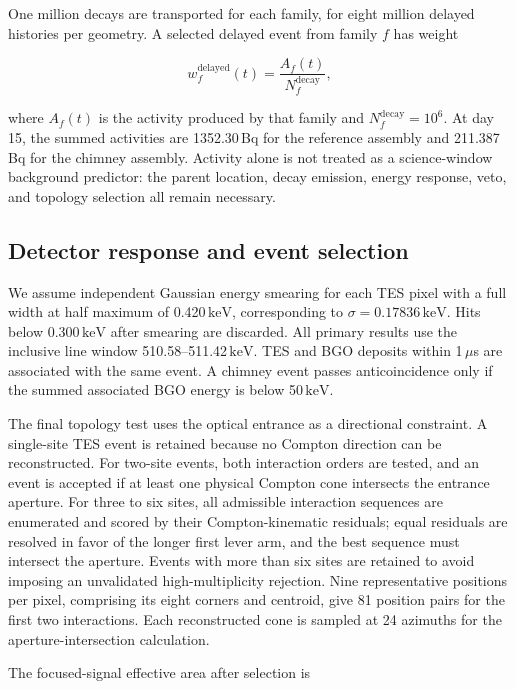 \documentclass[11pt]{article}
\newcommand{\keV}{\ensuremath{\,\mathrm{keV}}\xspace}
\begin{document}
One million decays are transported for each family, for eight million delayed
histories per geometry. A selected delayed event from family $f$ has weight

\begin{equation}
  w_f^{\mathrm{delayed}}(t)=\frac{A_f(t)}{N_f^{\mathrm{decay}}},
  \label{eq:delayedweight}
\end{equation}

where $A_f(t)$ is the activity produced by that family and
$N_f^{\mathrm{decay}}=10^6$. At day 15, the summed activities are 1352.30\,Bq
for the reference assembly and 211.387\,Bq for the chimney assembly. Activity
alone is not treated as a science-window background predictor: the parent
location, decay emission, energy response, veto, and topology selection all
remain necessary.

\subsection{Detector response and event selection}
\label{sec:selection}

We assume independent Gaussian energy smearing for each TES pixel with a full
width at half maximum of 0.420\keV, corresponding to
$\sigma=0.17836\keV$. Hits below 0.300\keV after smearing are discarded. All
primary results use the inclusive line window 510.58--511.42\keV. TES and BGO
deposits within 1\,$\mu$s are associated with the same event. A chimney event
passes anticoincidence only if the summed associated BGO energy is below
50\keV.

The final topology test uses the optical entrance as a directional constraint.
A single-site TES event is retained because no Compton direction can be
reconstructed. For two-site events, both interaction orders are tested, and an
event is accepted if at least one physical Compton cone intersects the entrance
aperture. For three to six sites, all admissible interaction sequences are
enumerated and scored by their Compton-kinematic residuals; equal residuals are
resolved in favor of the longer first lever arm, and the best sequence must
intersect the aperture. Events with more than six sites are retained to
avoid imposing an unvalidated high-multiplicity rejection. Nine representative
positions per pixel, comprising its eight corners and centroid, give 81
position pairs for the first two interactions. Each reconstructed cone is
sampled at 24 azimuths for the aperture-intersection calculation.

The focused-signal effective area after selection is
\end{document}
